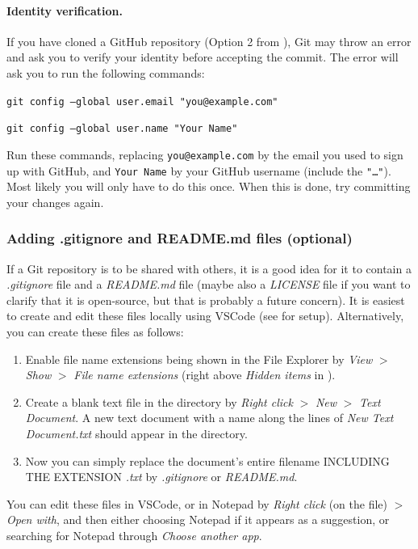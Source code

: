 \documentclass[a4paper,10pt]{article}
\begin{document}
\paragraph{Identity verification.} If you have cloned a GitHub repository (Option 2 from ), Git may throw an error and ask you to verify your identity before accepting the commit. The error will ask you to run the following commands:

\texttt{git config --global user.email "you@example.com"}

\texttt{git config --global user.name "Your Name"}

Run these commands, replacing \texttt{you@example.com} by the email you used to sign up with GitHub, and \texttt{Your Name} by your GitHub username (include the \texttt{"\dots"}). Most likely you will only have to do this once. When this is done, try committing your changes again.

\subsubsection{Adding .gitignore and README.md files (optional)}
\label{sec:gitignore}

If a Git repository is to be shared with others, it is a good idea for it to contain a \emph{.gitignore} file and a \emph{README.md} file (maybe also a \emph{LICENSE} file if you want to clarify that it is open-source, but that is probably a future concern). It is easiest to create and edit these files locally using VSCode (see  for setup). Alternatively, you can create these files as follows:
\begin{enumerate}
    \item Enable file name extensions being shown in the File Explorer by \emph{View} $>$ \emph{Show} $>$ \emph{File name extensions} (right above \emph{Hidden items} in ).
    \item Create a blank text file in the directory by \emph{Right click} $>$ \emph{New} $>$ \emph{Text Document}. A new text document with a name along the lines of \emph{New Text Document.txt} should appear in the directory.
    \item Now you can simply replace the document's entire filename INCLUDING THE EXTENSION \emph{.txt} by \emph{.gitignore} or \emph{README.md}.
\end{enumerate}
You can edit these files in VSCode, or in Notepad by \emph{Right click} (on the file) $>$ \emph{Open with}, and then either choosing Notepad if it appears as a suggestion, or searching for Notepad through \emph{Choose another app}.
\end{document}
